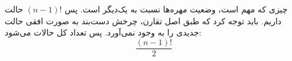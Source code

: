 چیزی که مهم است، وضعیت مهره‌ها نسبت به یک‌دیگر است. پس
$(n-1)!$
حالت داریم. باید توجه کرد که طبق اصل تقارن، چرخش دست‌بند به صورت افقی حالت جدیدی را به وجود نمی‌آورد. پس تعداد کل حالات می‌شود:
$$\frac{(n-1)!}{2}$$